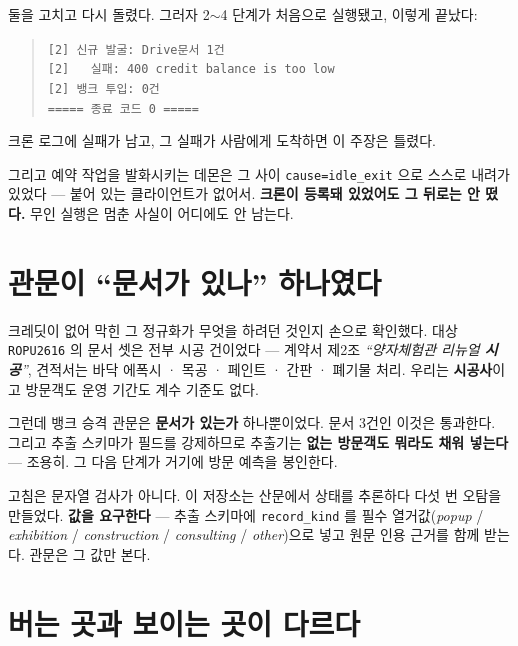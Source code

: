 \documentclass[10pt]{article}
\begin{document}
둘을 고치고 다시 돌렸다. 그러자 2$\sim$4 단계가 처음으로 실행됐고,
이렇게 끝났다:

\begin{quote}\small
\texttt{[2] 신규 발굴: Drive문서 1건}\\
\texttt{[2] \ \ 실패: 400 credit balance is too low}\\
\texttt{[2] 뱅크 투입: 0건}\\
\texttt{===== 종료 코드 0 =====}
\end{quote}

{크론 로그에 실패가 남고, 그 실패가 사람에게 도착하면 이 주장은 틀렸다.}

그리고 예약 작업을 발화시키는 데몬은 그 사이
\texttt{cause=idle\_exit} 으로 스스로 내려가 있었다 --- 붙어 있는
클라이언트가 없어서. \textbf{크론이 등록돼 있었어도 그 뒤로는 안 떴다.}
무인 실행은 멈춘 사실이 어디에도 안 남는다.

\section{관문이 ``문서가 있나'' 하나였다}

크레딧이 없어 막힌 그 정규화가 무엇을 하려던 것인지 손으로 확인했다.
대상 \texttt{ROPU2616} 의 문서 셋은 전부 시공 건이었다 --- 계약서 제2조
\emph{``양자체험관 리뉴얼 \textbf{시공}''}, 견적서는 바닥 에폭시 ·
목공 · 페인트 · 간판 · 폐기물 처리. 우리는 \textbf{시공사}이고 방문객도
운영 기간도 계수 기준도 없다.

그런데 뱅크 승격 관문은 \textbf{문서가 있는가} 하나뿐이었다. 문서 3건인
이것은 통과한다. 그리고 추출 스키마가 필드를 강제하므로 추출기는
\textbf{없는 방문객도 뭐라도 채워 넣는다} --- 조용히. 그 다음 단계가
거기에 방문 예측을 봉인한다.

고침은 문자열 검사가 아니다. 이 저장소는 산문에서 상태를 추론하다
다섯 번 오탐을 만들었다. \textbf{값을 요구한다} --- 추출 스키마에
\texttt{record\_kind} 를 필수 열거값(\emph{popup} / \emph{exhibition} /
\emph{construction} / \emph{consulting} / \emph{other})으로 넣고
원문 인용 근거를 함께 받는다. 관문은 그 값만 본다.


\section{버는 곳과 보이는 곳이 다르다}
\end{document}
